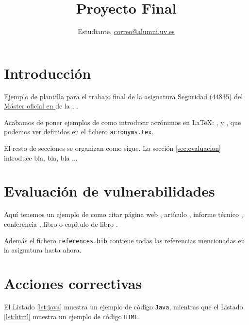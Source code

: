 \documentclass{twcam-entregable}
\title{Proyecto Final}
\author{Estudiante, \href{mailto:raul.penya@uv.es}{correo@alumni.uv.es}}
\begin{document}
\def\listtablename{\'Indice de tablas}%
\def\tablename{Tabla}%

\maketitle

\tableofcontents

\listoffigures
\listoftables
\lstlistoflistings

\clearpage

\section{Introducción}


Ejemplo de plantilla para el trabajo final de la asignatura \href{https://www.uv.es/uvweb/master-tecnologias-web-computacion-nube-aplicaciones-moviles/es/programa-del-master/plan-estudios/plan-estudios-twcam-1286006061961.html?idA=44835&idT=2234;2023}{Seguridad (44835)} del \href{https://www.uv.es/twcam}{Máster oficial en } de la \href{http://www.uv.es/etse}{},  \href{http://www.uv.es}{}.

Acabamos de poner ejemplos de como introducir acrónimos en \LaTeX{}: ,  y , que podemos ver definidos en el fichero {\tt acronyms.tex}.

El resto de secciones se organizan como sigue.
La sección \ref{sec:evaluacion} introduce bla, bla, bla ...


\section{Evaluación de vulnerabilidades\label{sec:evaluacion}}

Aquí tenemos un ejemplo de como citar página web \cite{Apache:website}, artículo \cite{Berners-Lee:IR-1992}, informe técnico \cite{Mell:NIST-SP-800-145}, conferencia \cite{Mowery:CCSW-2012}, libro \cite{SuarezSanchez-Ocana:Book-2012} o capítulo de libro \cite{Wen:LNICSSITE-2020}. 

Además el fichero {\tt references.bib} contiene todas las referencias mencionadas en la asignatura hasta ahora.

\section{Acciones correctivas\label{sec:correcciones}}

El Listado \ref{lst:java} muestra un ejemplo de código {\tt Java}, mientras que el Listado \ref{lst:html} muestra un ejemplo de código {\tt HTML}.
\end{document}
